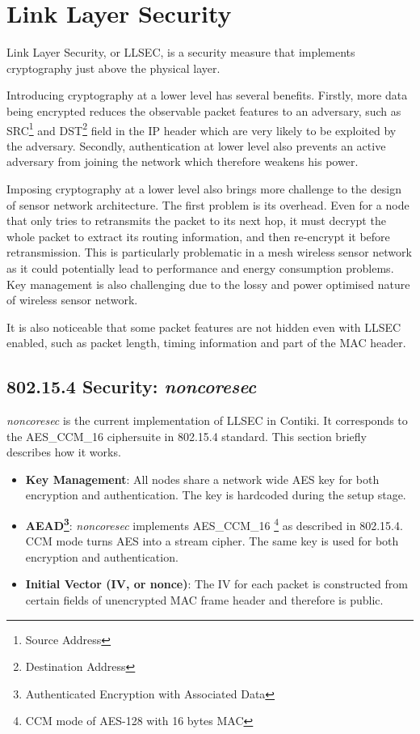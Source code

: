 \chapter{Link Layer Security} \label{Chp: LLSEC}

Link Layer Security, or LLSEC, is a security measure that implements cryptography just above the physical layer.

Introducing cryptography at a lower level has several benefits. Firstly, more data being encrypted reduces the observable packet features to an adversary, such as SRC\footnote{Source Address} and DST\footnote{Destination Address} field in the IP header which are very likely to be exploited by the adversary. Secondly, authentication at lower level also prevents an active adversary from joining the network which therefore weakens his power. 

Imposing cryptography at a lower level also brings more challenge to the design of sensor network architecture. The first problem is its overhead. Even for a node that only tries to retransmits the packet to its next hop, it must decrypt the whole packet to extract its routing information, and then re-encrypt it before retransmission. This is particularly problematic in a mesh wireless sensor network as it could potentially lead to performance and energy consumption problems. Key management is also challenging due to the lossy and power optimised nature of wireless sensor network.

It is also noticeable that some packet features are not hidden even with LLSEC enabled, such as packet length, timing information and part of the MAC header.

\section{802.15.4 Security: {\it noncoresec}} \label{sec: noncoresec}
{\it noncoresec}\cite{LLSEC} is the current implementation of LLSEC in Contiki. It corresponds to the AES\_CCM\_16 ciphersuite in 802.15.4 standard. This section briefly describes how it works.

\begin{itemize}
\item {\bf Key Management}: All nodes share a network wide AES key for both encryption and authentication. The key is hardcoded during the setup stage.

\item{\bf AEAD\footnote{Authenticated Encryption with Associated Data}}: {\it noncoresec} implements AES\_CCM\_16 \footnote{CCM mode of AES-128 with 16 bytes MAC} as described in 802.15.4\cite{802154}. CCM mode turns AES into a stream cipher. The same key is used for both encryption and authentication.

\item{\bf Initial Vector (IV, or nonce)}: The IV for each packet is constructed from certain fields of unencrypted MAC frame header and therefore is public.
\end{itemize}

